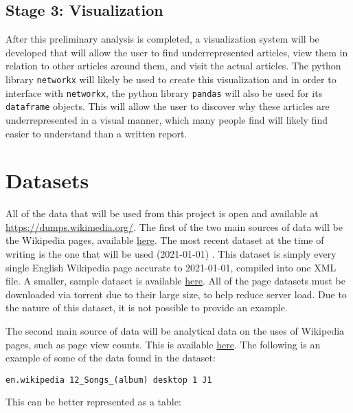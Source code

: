 \documentclass[fontsize=12pt]{article}
\begin{document}
\begin{multicols}{2}
    \subsection{Stage 3: Visualization}
    After this preliminary analysis is completed, a visualization system will be developed that will allow the user to find underrepresented articles, view them in relation to other articles around them, and visit the actual articles. The python library \texttt{networkx} will likely be used to create this visualization and in order to interface with \texttt{networkx}, the python library \texttt{pandas} will also be used for its \texttt{dataframe} objects.
    This will allow the user to discover why these articles are underrepresented in a visual manner, which many people find will likely find easier to understand than a written report.



    \section{Datasets}

    All of the data that will be used from this project is open and available at \href{https://dumps.wikimedia.org/}{https://dumps.wikimedia.org/}. \parencite{WikimediaDownloads}
    The first of the two main sources of data will be the Wikipedia pages, available \href{https://meta.wikimedia.org/wiki/Data_dump_torrents#English_Wikipedia}{here}. \parencite{DataDumpTorrents}
    The most recent dataset at the time of writing is the one that will be used (2021-01-01) .
    This dataset is simply every single English Wikipedia page accurate to 2021-01-01, compiled into one XML file. A smaller, sample dataset is available \href{http://itorrents.org/torrent/B23A2BDC351E58E041D79F335A3CF872DEBAE919.torrent}{here}. All of the page datasets must be downloaded via torrent due to their large size, to help reduce server load. Due to the nature of this dataset, it is not possible to provide an example.

    The second main source of data will be analytical data on the uses of Wikipedia pages, such as page view counts. This is available \href{https://dumps.wikimedia.org/other/analytics/}{here}. The following is an example of some of the data found in the dataset:

    \texttt{en.wikipedia 12\_Songs\_(album) desktop 1 J1}

    This can be better represented as a table:
    \end{multicols}
\end{document}
